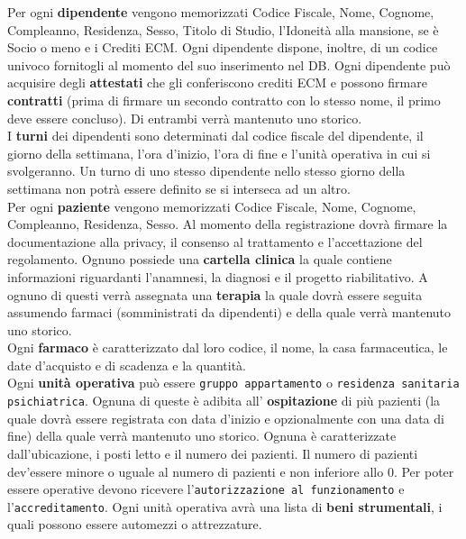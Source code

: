 \documentclass[a4paper, 12pt]{report}
\newenvironment{changemargin}[2]{%
  \begin{list}{}{%
    \setlength{\topsep}{0pt}%
    \setlength{\leftmargin}{#1}%
    \setlength{\rightmargin}{#2}%
    \setlength{\listparindent}{\parindent}%
    \setlength{\itemindent}{\parindent}%
    \setlength{\parsep}{\parskip}%
  }%
  \item[]}{\end{list}}
\begin{document}
\begin{changemargin}{0.5cm}{0.5cm}
        \noindent
        Per ogni \textbf{dipendente} vengono memorizzati Codice Fiscale, Nome, Cognome, Compleanno, Residenza, Sesso, Titolo di Studio,
        l'Idoneità alla mansione, se è Socio o meno e i Crediti ECM. Ogni dipendente dispone, inoltre, di un codice univoco fornitogli
        al momento del suo inserimento nel DB. 
        Ogni dipendente può acquisire degli \textbf{attestati} che gli conferiscono crediti ECM e possono firmare
        \textbf{contratti} (prima di firmare un secondo contratto con lo stesso nome, il primo deve essere concluso).
        Di entrambi verrà mantenuto uno storico.\\
        I \textbf{turni} dei dipendenti sono determinati dal codice fiscale del dipendente, il giorno della settimana, 
        l'ora d'inizio, l'ora di fine e l'unità operativa in cui si svolgeranno. Un turno di uno stesso dipendente nello stesso
        giorno della settimana non potrà essere definito se si interseca ad un altro.\\
        Per ogni \textbf{paziente} vengono memorizzati Codice Fiscale, Nome, Cognome, Compleanno, Residenza, Sesso.
        Al momento della registrazione dovrà firmare la documentazione alla privacy, il consenso al trattamento e l'accettazione
        del regolamento. Ognuno possiede una \textbf{cartella clinica} la quale contiene informazioni riguardanti
        l'anamnesi, la diagnosi e il progetto riabilitativo. A ognuno di questi verrà assegnata una 
        \textbf{terapia} la quale dovrà essere seguita assumendo farmaci (somministrati da dipendenti) e della quale
        verrà mantenuto uno storico.\\
        Ogni \textbf{farmaco} è caratterizzato dal loro codice, il nome, la casa farmaceutica, le date d'acquisto e
        di scadenza e la quantità.\\
        Ogni \textbf{unità operativa} può essere \texttt{gruppo appartamento} o \texttt{residenza sanitaria psichiatrica}.
        Ognuna di queste è adibita all' \textbf{ospitazione} di più pazienti (la quale dovrà essere registrata
        con data d'inizio e opzionalmente con una data di fine) della quale verrà mantenuto uno storico.
        Ognuna è caratterizzate dall'ubicazione, i posti letto e il numero dei pazienti. Il numero di pazienti dev'essere
        minore o uguale al numero di pazienti e non inferiore allo 0.
        Per poter essere operative devono ricevere l'\texttt{autorizzazione al funzionamento} e l'\texttt{accreditamento}.
        Ogni unità operativa avrà una lista di \textbf{beni strumentali}, i quali possono essere automezzi o attrezzature.
        \newline
\end{changemargin}
\end{document}
